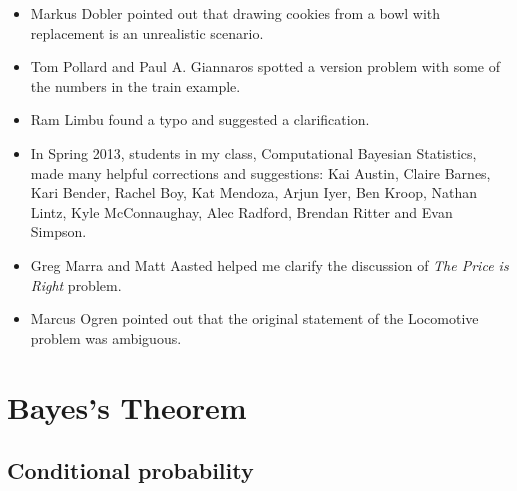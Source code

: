 \documentclass[12pt]{book}
\begin{document}
\begin{itemize}
\item Markus Dobler pointed out that drawing cookies from a bowl
with replacement is an unrealistic scenario.

\item Tom Pollard and Paul A. Giannaros spotted a version problem with
  some of the numbers in the train example.

\item Ram Limbu found a typo and suggested a clarification.

\item In Spring 2013, students in my class, Computational Bayesian
  Statistics, made many helpful corrections and suggestions: Kai
  Austin, Claire Barnes, Kari Bender, Rachel Boy, Kat Mendoza, Arjun
  Iyer, Ben Kroop, Nathan Lintz, Kyle McConnaughay, Alec Radford,
  Brendan Ritter and Evan Simpson.

\item Greg Marra and Matt Aasted helped me clarify the discussion of
  {\it The Price is Right} problem.

\item Marcus Ogren pointed out that the original statement of the
  Locomotive problem was ambiguous.


\end{itemize}

\normalsize

\clearemptydoublepage

\begin{latexonly}

\tableofcontents

\clearemptydoublepage

\end{latexonly}

\mainmatter

\newcommand{\p}[1]{\ensuremath{\mathrm{p}(#1)}}
\newcommand{\odds}[1]{\ensuremath{\mathrm{o}(#1)}}
\newcommand{\T}[1]{\mbox{#1}}
\newcommand{\AND}{~\mathrm{and}~}
\newcommand{\NOT}{\mathrm{not}~}


\chapter{Bayes's Theorem}
\label{intro}

\section{Conditional probability}
\end{document}
